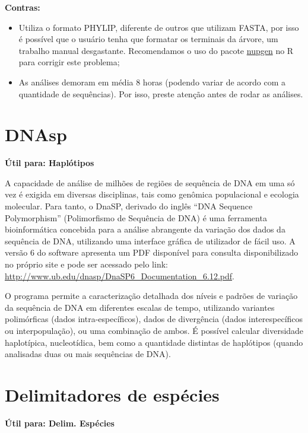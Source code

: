 \documentclass[
  letterpaper,
  DIV=11,
  numbers=noendperiod]{scrreprt}
\begin{document}
\textbf{Contras:}

\begin{itemize}
\item
  Utiliza o formato PHYLIP, diferente de outros que utilizam FASTA, por
  isso é possível que o usuário tenha que formatar os terminais da
  árvore, um trabalho manual desgastante. Recomendamos o uso do pacote
  \protect\hyperlink{pacote-nupgen-r}{nupgen} no R para corrigir este
  problema;
\item
  As análises demoram em média 8 horas (podendo variar de acordo com a
  quantidade de sequências). Por isso, preste atenção antes de rodar as
  análises.
\end{itemize}

\hypertarget{dnasp}{%
\section{DNAsp}\label{dnasp}}

\textbf{Útil para: {Haplótipos}}

A capacidade de análise de milhões de regiões de sequência de DNA em uma
só vez é exigida em diversas disciplinas, tais como genômica
populacional e ecologia molecular. Para tanto, o DnaSP, derivado do
inglês ``DNA Sequence Polymorphism'' (Polimorfismo de Sequência de DNA)
é uma ferramenta bioinformática concebida para a análise abrangente da
variação dos dados da sequência de DNA, utilizando uma interface gráfica
de utilizador de fácil uso. A versão 6 do software apresenta um PDF
disponível para consulta disponibilizado no próprio site e pode ser
acessado pelo link:
\url{http://www.ub.edu/dnasp/DnaSP6_Documentation_6.12.pdf}.

O programa permite a caracterização detalhada dos níveis e padrões de
variação da sequência de DNA em diferentes escalas de tempo, utilizando
variantes polimórficas (dados intra-específicos), dados de divergência
(dados interespecíficos ou interpopulação), ou uma combinação de ambos.
É possível calcular diversidade haplotípica, nucleotídica, bem como a
quantidade distintas de haplótipos (quando analisadas duas ou mais
sequências de DNA).

\hypertarget{delimitadores-de-espuxe9cies}{%
\section{Delimitadores de espécies}\label{delimitadores-de-espuxe9cies}}

\textbf{Útil para: {Delim. Espécies}}
\end{document}
